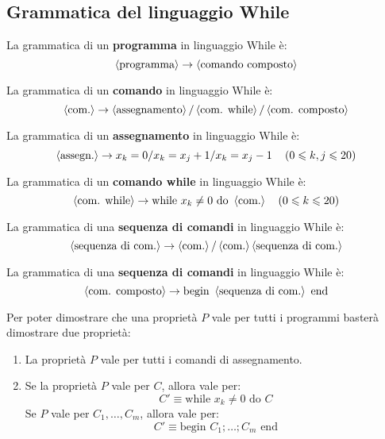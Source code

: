 \documentclass{lectures}
\begin{document}
\subsection{Grammatica del linguaggio While}
\begin{multicols}{2}
\begin{definition}
    La grammatica di un \textbf{programma} in linguaggio While è:
    \[
        \left\langle\text{programma}\right\rangle \rightarrow \left\langle\text{comando composto}\right\rangle
    \]
\end{definition}
\begin{definition}
    La grammatica di un \textbf{comando} in linguaggio While è:
    \[
        \left\langle\text{com.}\right\rangle \rightarrow \left\langle\text{assegnamento}\right\rangle / \left\langle\text{com. while}\right\rangle / \left\langle\text{com. composto}\right\rangle
    \]
\end{definition}
\begin{definition}
    La grammatica di un \textbf{assegnamento} in linguaggio While è:
    \[
        \left\langle\text{assegn.}\right\rangle \rightarrow x_k = 0 / x_k = x_j+1 / x_k = x_j -1 \quad \left(0\leqslant k, j\leqslant 20\right)
    \]
\end{definition}
\begin{definition}
    La grammatica di un \textbf{comando while} in linguaggio While è:
    \[
        \left\langle\text{com. while}\right\rangle \rightarrow \text{while } x_k \neq 0 \text{ do }\left\langle\text{com.}\right\rangle\quad\left(0\leqslant k \leqslant 20\right)
    \]
\end{definition}
\begin{definition}
    La grammatica di una \textbf{sequenza di comandi} in linguaggio While è:
    \[
        \left\langle\text{sequenza di com.}\right\rangle \rightarrow \left\langle\text{com.}\right\rangle / \left\langle\text{com.}\right\rangle\left\langle\text{sequenza di com.}\right\rangle
    \]
\end{definition}
\begin{definition}
    La grammatica di una \textbf{sequenza di comandi} in linguaggio While è:
    \[
        \left\langle\text{com. composto}\right\rangle \rightarrow  \text{begin }\left\langle\text{sequenza di com.}\right\rangle\text{ end}
    \]
\end{definition}
\begin{observation}
    Per poter dimostrare che una proprietà \(P\) vale per tutti i programmi basterà dimostrare due proprietà:
    \begin{enumerate}
        \item La proprietà \(P\) vale per tutti i comandi di assegnamento.
        \item Se la proprietà \(P\) vale per \(C\), allora vale per:
        \[
            C' \equiv \text{while }x_k \neq 0\text{ do }C
        \]
        Se \(P\) vale per \(C_1, \ldots, C_m\), allora vale per:
        \[
            C' \equiv \text{begin }C_1;\ldots;C_m\text{ end}
        \]
    \end{enumerate}
\end{observation}
\end{multicols}
\clearpage
\end{document}
